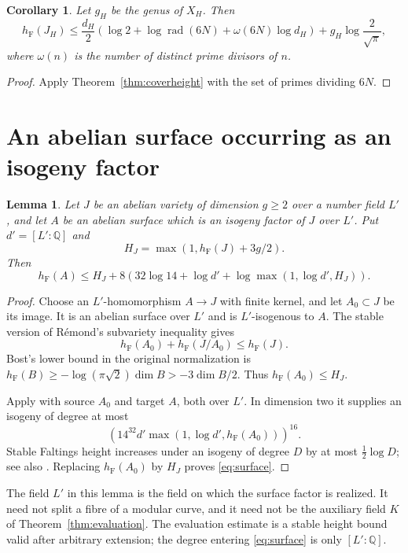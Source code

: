\documentclass[11pt,a4paper]{article}
\newtheorem{lemma}[theorem]{Lemma}
\newtheorem{corollary}[theorem]{Corollary}
\theoremstyle{definition}
\newcommand{\Q}{\mathbb Q}
\newcommand{\hF}{h_{\mathrm F}}
\newcommand{\rad}{\operatorname{rad}}
\begin{document}
\begin{corollary}\label{cor:modularheight}
Let $g_H$ be the genus of $X_H$. Then
\[
 \hF(J_H)\le
 \frac{d_H}{2}\left(\log2+\log\rad(6N)+\omega(6N)\log d_H\right)
 +g_H\log\frac2{\sqrt\pi},
\]
where $\omega(n)$ is the number of distinct prime divisors of $n$.
\end{corollary}
\begin{proof}
Apply Theorem~\ref{thm:coverheight} with the set of primes dividing
$6N$.
\end{proof}

\section{An abelian surface occurring as an isogeny factor}

\begin{lemma}\label{lem:surface}
Let $J$ be an abelian variety of dimension $g\ge2$ over a number
field $L'$, and let $A$ be an abelian surface which is an isogeny
factor of $J$ over $L'$. Put $d'=[L':\Q]$ and
\[
 H_J=\max(1,\hF(J)+3g/2).
\]
Then
\begin{equation}\label{eq:surface}
 \hF(A)\le H_J+
 8\left(32\log14+\log d'+
                \log\max(1,\log d',H_J)\right).
\end{equation}
\end{lemma}
\begin{proof}
Choose an $L'$-homomorphism $A\to J$ with finite kernel, and
let $A_0\subset J$ be its image. It is an abelian surface over
$L'$ and is $L'$-isogenous to $A$.
The stable version of R\'emond's subvariety inequality
\cite[Corollary~1.2 and the paragraph following Corollary~1.3]{Remond}
gives
\[
 \hF(A_0)+\hF(J/A_0)\le\hF(J).
\]
Bost's lower bound in the original normalization is
$\hF(B)\ge-\log(\pi\sqrt2)\dim B>-3\dim B/2$.
Thus $\hF(A_0)\le H_J$.

Apply \cite[Theorem~1.9(1)]{GaudronRemond} with source $A_0$
and target $A$, both over $L'$. In dimension two it supplies an
isogeny of degree at most
\[
 \left(14^{32}d'\max(1,\log d',\hF(A_0))\right)^{16}.
\]
Stable Faltings height increases under an isogeny of degree $D$
by at most $\frac12\log D$; see also
\cite[Proposition~2.1]{Remond}. Replacing $\hF(A_0)$ by $H_J$
proves \eqref{eq:surface}.
\end{proof}

The field $L'$ in this lemma is the field on which the surface
factor is realized. It need not split a fibre of a modular curve,
and it need not be the auxiliary field $K$ of
Theorem~\ref{thm:evaluation}. The evaluation estimate is a stable
height bound valid after arbitrary extension; the degree entering
\eqref{eq:surface} is only $[L':\Q]$.
\end{document}
